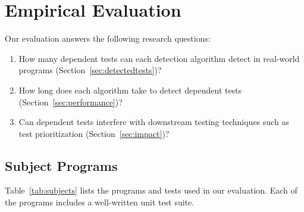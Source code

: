 \section{Empirical Evaluation}
\label{sec:evaluation}


\newcommand{\jt}{Joda-Time\xspace}

\newcommand{\jfreecharttests}{2234\xspace}%
\newcommand{\jodatimetests}{3875\xspace}
\newcommand{\xmlsecuritytests}{108\xspace}
\newcommand{\crystaltests}{75\xspace}
\newcommand{\synoptictests}{118\xspace}
\newcommand{\totaltests}{4176\xspace}

\newcommand{\jfreechartautotests}{2946\xspace}
\newcommand{\jodatimeautotests}{2639\xspace}
\newcommand{\xmlsecurityautotests}{665\xspace}
\newcommand{\crystalautotests}{3198\xspace}
\newcommand{\synopticautotests}{2467\xspace}
\newcommand{\totalautotests}{8969\xspace}




Our evaluation answers the following research questions:

\tinysqueeze


\begin{enumerate}
\tinysqueeze
\item How many dependent tests can each detection
algorithm detect in
real-world programs (Section~\ref{sec:detectedtests})?

\item How long does each algorithm take to detect dependent
tests (Section~\ref{sec:performance})?

\item Can dependent tests interfere with downstream testing techniques
such as test prioritization (Section~\ref{sec:impact})?

\end{enumerate}

\subsection{Subject Programs}


Table~\ref{tab:subjects} lists the programs and
tests used in our evaluation.
Each of the programs includes a well-written unit test suite.

